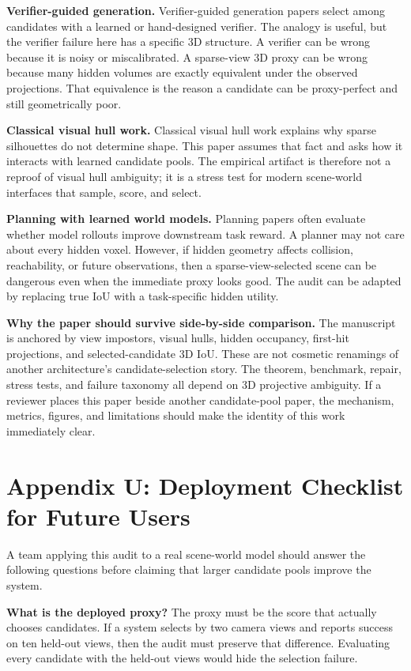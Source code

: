 \documentclass{article}
\begin{document}
\textbf{Verifier-guided generation.}
Verifier-guided generation papers select among candidates with a learned or
hand-designed verifier. The analogy is useful, but the verifier failure here
has a specific 3D structure. A verifier can be wrong because it is noisy or
miscalibrated. A sparse-view 3D proxy can be wrong because many hidden volumes
are exactly equivalent under the observed projections. That equivalence is the
reason a candidate can be proxy-perfect and still geometrically poor.

\textbf{Classical visual hull work.}
Classical visual hull work explains why sparse silhouettes do not determine
shape. This paper assumes that fact and asks how it interacts with learned
candidate pools. The empirical artifact is therefore not a reproof of visual
hull ambiguity; it is a stress test for modern scene-world interfaces that
sample, score, and select.

\textbf{Planning with learned world models.}
Planning papers often evaluate whether model rollouts improve downstream task
reward. A planner may not care about every hidden voxel. However, if hidden
geometry affects collision, reachability, or future observations, then a
sparse-view-selected scene can be dangerous even when the immediate proxy looks
good. The audit can be adapted by replacing true IoU with a task-specific
hidden utility.

\textbf{Why the paper should survive side-by-side comparison.}
The manuscript is anchored by view impostors, visual hulls, hidden occupancy,
first-hit projections, and selected-candidate 3D IoU. These are not cosmetic
renamings of another architecture's candidate-selection story. The theorem,
benchmark, repair, stress tests, and failure taxonomy all depend on 3D
projective ambiguity. If a reviewer places this paper beside another
candidate-pool paper, the mechanism, metrics, figures, and limitations should
make the identity of this work immediately clear.

\section{Appendix U: Deployment Checklist for Future Users}

A team applying this audit to a real scene-world model should answer the
following questions before claiming that larger candidate pools improve the
system.

\textbf{What is the deployed proxy?}
The proxy must be the score that actually chooses candidates. If a system
selects by two camera views and reports success on ten held-out views, then
the audit must preserve that difference. Evaluating every candidate with the
held-out views would hide the selection failure.
\end{document}
